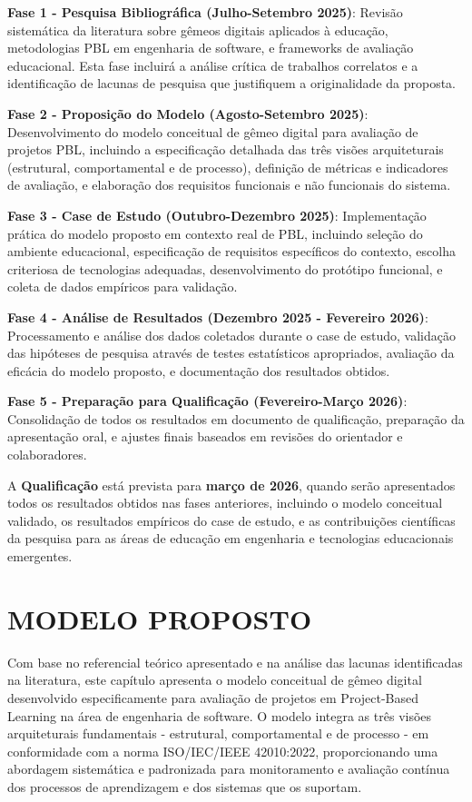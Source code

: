 \documentclass[12pt,a4paper]{article}
\begin{document}
\textbf{Fase 1 - Pesquisa Bibliográfica (Julho-Setembro 2025)}: Revisão sistemática da literatura sobre gêmeos digitais aplicados à educação, metodologias PBL em engenharia de software, e frameworks de avaliação educacional. Esta fase incluirá a análise crítica de trabalhos correlatos e a identificação de lacunas de pesquisa que justifiquem a originalidade da proposta.

\textbf{Fase 2 - Proposição do Modelo (Agosto-Setembro 2025)}: Desenvolvimento do modelo conceitual de gêmeo digital para avaliação de projetos PBL, incluindo a especificação detalhada das três visões arquiteturais (estrutural, comportamental e de processo), definição de métricas e indicadores de avaliação, e elaboração dos requisitos funcionais e não funcionais do sistema.

\textbf{Fase 3 - Case de Estudo (Outubro-Dezembro 2025)}: Implementação prática do modelo proposto em contexto real de PBL, incluindo seleção do ambiente educacional, especificação de requisitos específicos do contexto, escolha criteriosa de tecnologias adequadas, desenvolvimento do protótipo funcional, e coleta de dados empíricos para validação.

\textbf{Fase 4 - Análise de Resultados (Dezembro 2025 - Fevereiro 2026)}: Processamento e análise dos dados coletados durante o case de estudo, validação das hipóteses de pesquisa através de testes estatísticos apropriados, avaliação da eficácia do modelo proposto, e documentação dos resultados obtidos.

\textbf{Fase 5 - Preparação para Qualificação (Fevereiro-Março 2026)}: Consolidação de todos os resultados em documento de qualificação, preparação da apresentação oral, e ajustes finais baseados em revisões do orientador e colaboradores.

A \textbf{Qualificação} está prevista para \textbf{março de 2026}, quando serão
apresentados todos os resultados obtidos nas fases anteriores, incluindo o
modelo conceitual validado, os resultados empíricos do case de estudo, e as
contribuições científicas da pesquisa para as áreas de educação em engenharia e
tecnologias educacionais emergentes.

\section{MODELO PROPOSTO}

Com base no referencial teórico apresentado e na análise das lacunas
identificadas na literatura, este capítulo apresenta o modelo conceitual de
gêmeo digital desenvolvido especificamente para
avaliação de projetos em Project-Based Learning na área de engenharia de
software. O modelo integra as três visões arquiteturais fundamentais -
estrutural, comportamental e de processo - em conformidade com a norma
ISO/IEC/IEEE 42010:2022, proporcionando uma abordagem sistemática e padronizada
para monitoramento e avaliação contínua dos processos de aprendizagem e dos
sistemas que os suportam.
\end{document}
